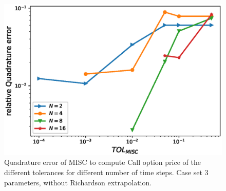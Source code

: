 \documentclass[11pt]{article}
\begin{document}
\begin{figure}[h!]
	\centering
	\includegraphics[width=0.7\linewidth]{./figures/rBergomi_MISC_quadratre_error/vs_TOL/set3/relative_quad_error_wrt_MISC_TOL_set3_non_rich}
	
	
	\caption{Quadrature error of MISC to compute Call option price of the different tolerances for different number of time steps. Case  set $3$ parameters, without Richardson extrapolation.}
	\label{fig:Quadrature_error_set3}
\end{figure}
\end{document}
